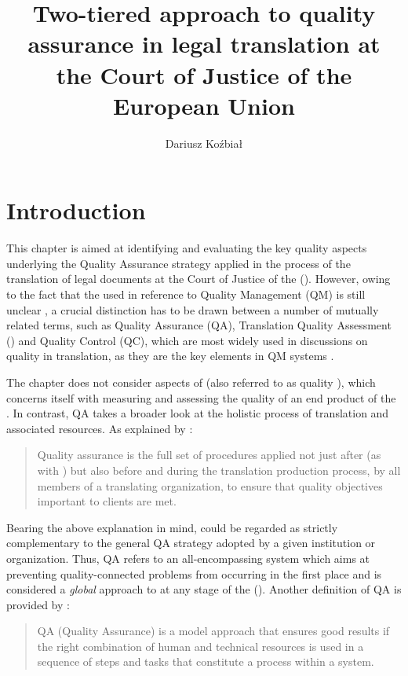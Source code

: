 \documentclass[output=paper]{langsci/langscibook}
\author{Dariusz Koźbiał\affiliation{University of Warsaw}}
\title{Two-tiered approach to quality assurance in legal translation  at the Court of Justice of the European Union}
\begin{document}
\section{Introduction}\label{sec:kozbial:1}

This chapter is aimed at identifying and evaluating the key quality aspects underlying the Quality Assurance strategy applied in the process of the translation of legal documents at the Court of Justice of the  (). However, owing to the fact that the  used in reference to Quality Management (QM) is still unclear \citep[168]{Lušicky2017}, a crucial distinction has to be drawn between a number of mutually related terms, such as Quality Assurance (QA), Translation Quality Assessment () and Quality Control (QC), which are most widely used in discussions on quality in translation, as they are the key elements in QM systems \citep[168]{Lušicky2017}.

The chapter does not consider aspects of  (also referred to as quality ), which concerns itself with measuring and assessing the quality of an end product of the  \citep[76]{Drugan2013}. In contrast, QA takes a broader look at the holistic process of translation and associated resources. As explained by \citet[129]{Mossop2014}:


\begin{quote}
Quality assurance is the full set of procedures applied not just after (as with ) but also before and during the translation production process, by all members of a translating organization, to ensure that quality objectives important to clients are met.
\end{quote}


Bearing the above explanation in mind,  could be regarded as strictly complementary to the general QA strategy adopted by a given institution or organization. Thus, QA refers to an all-encompassing system which aims at preventing quality-connected problems from occurring in the first place and is considered a \textit{global} approach to  at any stage of the  (\citealt[76]{Drugan2013}). Another definition of QA is provided by \citet[342]{Popiołek2015}:

\begin{quote}
QA (Quality Assurance) is a model approach that ensures good results if the right combination of human and technical resources is used in a sequence of steps and tasks that constitute a process within a system.
\end{quote}
\end{document}
